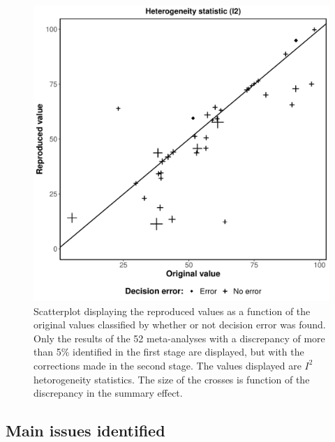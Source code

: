 \documentclass[
  ,jou, a4paper,floatsintext]{apa6}
\begin{document}
\begin{figure}
\centering
\includegraphics{manuscript_files/figure-latex/unnamed-chunk-5-1.pdf}
\caption{\label{fig:unnamed-chunk-5}Scatterplot displaying the reproduced values as a function of the original values classified by whether or not decision error was found. Only the results of the 52 meta-analyses with a discrepancy of more than 5\% identified in the first stage are displayed, but with the corrections made in the second stage. The values displayed are \(I^2\) hetorogeneity statistics. The size of the crosses is function of the discrepancy in the summary effect.}
\end{figure}

\hypertarget{main-issues-identified}{%
\subsection{Main issues identified}\label{main-issues-identified}}
\end{document}
